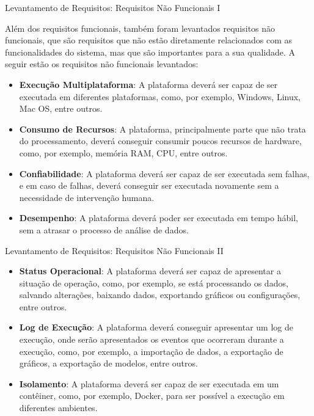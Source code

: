 \begin{frame}{Levantamento de Requisitos: Requisitos Não Funcionais I}

	\quad Além dos requisitos funcionais, também foram levantados requisitos não funcionais, que são requisitos que não estão diretamente relacionados com as funcionalidades do sistema, mas que são importantes para a sua qualidade. A seguir estão os requisitos não funcionais levantados:

	\bigskip

	\begin{itemize}
		\item \textbf{Execução Multiplataforma}: A plataforma deverá ser capaz de ser executada em diferentes plataformas, como, por exemplo, Windows, Linux, Mac OS, entre outros.
		\item \textbf{Consumo de Recursos}: A plataforma, principalmente parte que não trata do processamento, deverá conseguir consumir poucos recursos de hardware, como, por exemplo, memória RAM, CPU, entre outros.
		\item \textbf{Confiabilidade}: A plataforma deverá ser capaz de ser executada sem falhas, e em caso de falhas, deverá conseguir ser executada novamente sem a necessidade de intervenção humana.
		\item \textbf{Desempenho}: A plataforma deverá poder ser executada em tempo hábil, sem a atrasar o processo de análise de dados.
	\end{itemize}
\end{frame}

\begin{frame}{Levantamento de Requisitos: Requisitos Não Funcionais II}
	\begin{itemize}
		\item \textbf{Status Operacional}: A plataforma deverá ser capaz de apresentar a situação de operação, como, por exemplo, se está processando os dados, salvando alterações, baixando dados, exportando gráficos ou configurações, entre outros.
		\item \textbf{Log de Execução}: A plataforma deverá conseguir apresentar um log de execução, onde serão apresentados os eventos que ocorreram durante a execução, como, por exemplo, a importação de dados, a exportação de gráficos, a exportação de modelos, entre outros.
		\item \textbf{Isolamento}: A plataforma deverá ser capaz de ser executada em um contêiner, como, por exemplo, Docker, para ser possível a execução em diferentes ambientes.
	\end{itemize}
\end{frame}
